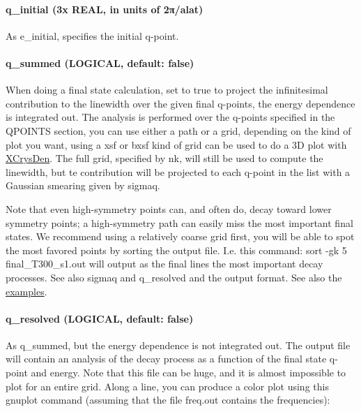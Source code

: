 \documentclass[
]{article}
\begin{document}
\hypertarget{q_initial-3x-real-in-units-of-2ux3c0alat}{%
\paragraph{q\_initial (3x REAL, in units of
2π/alat)}\label{q_initial-3x-real-in-units-of-2ux3c0alat}}

As e\_initial, specifies the initial q-point.

\hypertarget{q_summed-logical-default-false}{%
\paragraph{q\_summed (LOGICAL, default:
false)}\label{q_summed-logical-default-false}}

When doing a final state calculation, set to true to project the
infinitesimal contribution to the linewidth over the given final
q-points, the energy dependence is integrated out. The analysis is
performed over the q-points specified in the QPOINTS section, you can
use either a path or a grid, depending on the kind of plot you want,
using a xsf or bxsf kind of grid can be used to do a 3D plot with
\href{http://www.xcrysden.org}{XCrysDen}. The full grid, specified by
nk, will still be used to compute the linewidth, but te contribution
will be projected to each q-point in the list with a Gaussian smearing
given by sigmaq.

Note that even high-symmetry points can, and often do, decay toward
lower symmetry points; a high-symmetry path can easily miss the most
important final states. We recommend using a relatively coarse grid
first, you will be able to spot the most favored points by sorting the
output file. I.e. this command: sort -gk 5 final\_T300\_s1.out will
output as the final lines the most important decay processes. See also
sigmaq and q\_resolved and the output format. See also the
\protect\hyperlink{compute-the-spectral-function-along-a-path}{examples}.

\hypertarget{q_resolved-logical-default-false}{%
\paragraph{q\_resolved (LOGICAL, default:
false)}\label{q_resolved-logical-default-false}}

As q\_summed, but the energy dependence is not integrated out. The
output file will contain an analysis of the decay process as a function
of the final state q-point and energy. Note that this file can be huge,
and it is almost impossible to plot for an entire grid. Along a line,
you can produce a color plot using this gnuplot command (assuming that
the file freq.out contains the frequencies):
\end{document}
